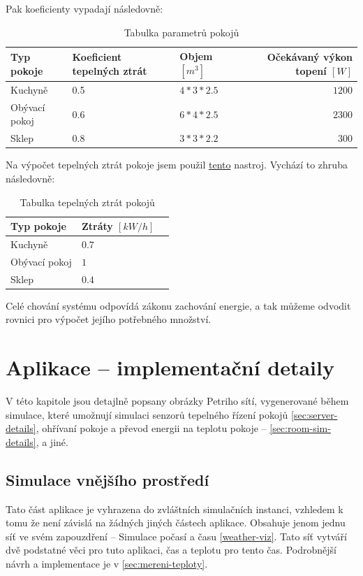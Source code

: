Pak koeficienty vypadají následovně:

\begin{table}[H]
  \vskip6pt
  \caption{Tabulka parametrů pokojů}
   \vskip6pt
  \centering
  \begin{tabular}{lllr}
    \toprule
    Typ pokoje & Koeficient tepelných ztrát & Objem $[m^3]$ & Očekávaný výkon topení $[W]$ \\
   \midrule
   Kuchyně & 0.5 & $4*3*2.5$ & $1200$ \\
   Obývací pokoj & 0.6 & $6*4*2.5$ & $2300$ \\
   Sklep & 0.8 & $3*3*2.2$ & $300$ \\
    \bottomrule
  \end{tabular}
  \label{tab:Parametry}
\end{table}

Na výpočet tepelných ztrát pokoje jsem použil \href{https://wpcalc.com/kalkulyator-teplopoter/}{tento} nastroj.
Vychází to zhruba následovně:

\begin{table}[H]
  \vskip6pt
  \caption{Tabulka tepelných ztrát pokojů}
   \vskip6pt
  \centering
  \begin{tabular}{llr}
    \toprule
    Typ pokoje & Ztráty $[kW/h]$ \\
    \midrule
    Kuchyně & $0.7$ \\
   Obývací pokoj & $1$ \\
   Sklep & $0.4$ \\
    \bottomrule
  \end{tabular}
  \label{tab:tepelne-ztraty}
\end{table}

Celé chování systému odpovídá zákonu zachování energie, a tak můžeme odvodit rovnici pro výpočet jejího potřebného množství.

\chapter{Aplikace -- implementační detaily}
\label{chap:app-implementation}

V této kapitole jsou detajlně popsany obrázky Petriho sítí, vygenerované během simulace, které umožnují simulaci senzorů tepelného řízení pokojů \ref{sec:server-details}, ohřívaní pokoje a převod energii na teplotu pokoje -- \ref{sec:room-sim-details}, a jiné.

\section{Simulace vnějšího prostředí}
Tato část aplikace je vyhrazena do zvláštních simulačních instanci, vzhledem k tomu že není závislá na žádných jiných částech aplikace. Obsahuje jenom jednu síť ve svém zapouzdření -- Simulace počasí a času \ref{weather-viz}. Tato síť vytváří dvě podstatné věci pro tuto aplikaci, čas a teplotu pro tento čas. Podrobnější návrh a implementace je v \ref{sec:mereni-teploty}.


